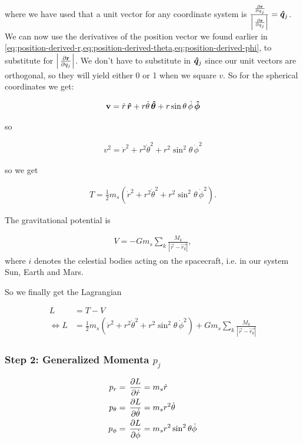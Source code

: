 where we have used that a unit vector for any coordinate system is \(\frac{\operatorname{}\frac{\partial \mathbf{r}}{\partial q_j}}{\left|\operatorname{}\frac{\partial \mathbf{r}}{\partial q_j}\right|} = \operatorname{}\!\bm{\hat{q}}_j\).
We can now use the derivatives of the position vector we found earlier in \cref{eq:position-derived-r,eq:position-derived-theta,eq:position-derived-phi}, to substitute for \(\left|\operatorname{}\frac{\partial \mathbf{r}}{\partial q_j}\right|\). We don't have to substitute in \(\operatorname{}\!\bm{\hat{q}}_j\) since our unit vectors are orthogonal, so they will yield either 0 or 1 when we square \(v\). So for the spherical coordinates we get:

\begin{align}
    \mathbf{v} = \dot{r}\operatorname{}\!\bm{\hat{r}} + r\dot{\theta}\operatorname{}\!\bm{\hat{\theta}} + r\sin{\theta}\,\dot{\phi}\operatorname{}\!\bm{\hat{\phi}}
\end{align}

so

\begin{align}
    v^2 = \dot{r}^2 + r^2\dot{\theta}^2 + r^2\sin^2{\theta}\,\dot{\phi}^2
\end{align}

so we get

\begin{align}
    T = \frac{1}{2} m_s (\dot{r}^2 + r^2\dot{\theta}^2 + r^2\sin^2{\theta}\,\dot{\phi}^2).
\end{align}

The gravitational potential is \cite{WikiGravPotential}

\begin{align}
    V = -G m_s \sum\limits_{k} \frac{M_k}{\left| \vec{r} - \vec{r_k} \right|},
\end{align}
where \(i\) denotes the celestial bodies acting on the spacecraft, i.e. in our system Sun, Earth and Mars.

So we finally get the Lagrangian

\begin{align}
    L &= T - V \\
    \Leftrightarrow L &= \frac{1}{2} m_s (\dot{r}^2 + r^2\dot{\theta}^2 + r^2\sin^2{\theta}\,\dot{\phi}^2) + G m_s \sum\limits_{k} \frac{M_k}{\left| \vec{r} - \vec{r_k} \right|}
\end{align}

\subsubsection{Step 2: Generalized Momenta \(p_j\)}
\begin{align}
    p_r &= \operatorname{}\frac{\partial L}{\partial \dot{r}} = m_s \dot{r} \label{eq:pr} \\
    p_\theta &= \operatorname{}\frac{\partial L}{\partial \dot{\theta}} = m_s r^2 \dot{\theta} \label{eq:ptheta} \\
    p_\phi &= \operatorname{}\frac{\partial L}{\partial \dot{\phi}} = m_s r^2 \sin^2{\theta} \dot{\phi} \label{eq:pphi}
\end{align}

